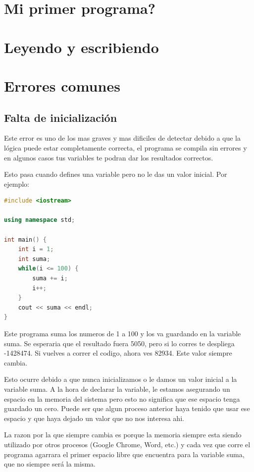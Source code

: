 \documentclass{article}
\begin{document}
\section{Mi primer programa?}

\section{Leyendo y escribiendo}

\section{Errores comunes}

\subsection{Falta de inicialización}
Este error es uno de los mas graves y mas dificiles de detectar debido a que la lógica puede estar completamente correcta, el programa se compila sin errores y en algunos casos tus variables te podran dar los resultados correctos.

Esto pasa cuando defines una variable pero no le das un valor inicial. Por ejemplo:

\begin{lstlisting}[language=C++, caption=Error de inicialización]
#include <iostream>

using namespace std;

int main() {
    int i = 1;
    int suma;
    while(i <= 100) {
        suma += i;
        i++;
    }
    cout << suma << endl;
}
\end{lstlisting}

Este programa suma los numeros de 1 a 100 y los va guardando en la variable suma. Se esperaria que el resultado fuera 5050, pero si lo corres te despliega -1428474. Si vuelves a correr el codigo, ahora ves 82934. Este valor siempre cambia.

Esto ocurre debido a que nunca inicializamos o le damos un valor inicial a la variable suma. A la hora de declarar la variable, le estamos asegurando un espacio en la memoria del sistema pero esto no significa que ese espacio tenga guardado un cero. Puede ser que algun proceso anterior haya tenido que usar ese espacio y que haya dejado un valor que no nos interesa ahi.

La razon por la que siempre cambia es porque la memoria siempre esta siendo utilizado por otros procesos (Google Chrome, Word, etc.) y cada vez que corre el programa agarrara el primer espacio libre que encuentra para la variable suma, que no siempre será la misma.
\end{document}
